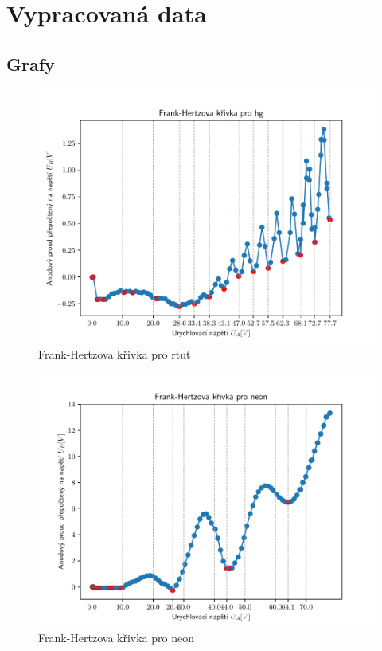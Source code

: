 \documentclass{article}
\begin{document}
\section{Vypracovaná data}
\subsection{Grafy}
\begin{figure}[!h]
  \hspace*{-10em}
  \includegraphics[scale=1.2]{data/hg.pdf}
  \caption{Frank-Hertzova křivka pro rtuť}
\end{figure}
\begin{figure}[!h]
  \hspace*{-10em}
  \includegraphics[scale=1.2]{data/neon.pdf}
  \caption{Frank-Hertzova křivka pro neon}
\end{figure}
\newpage
\end{document}
